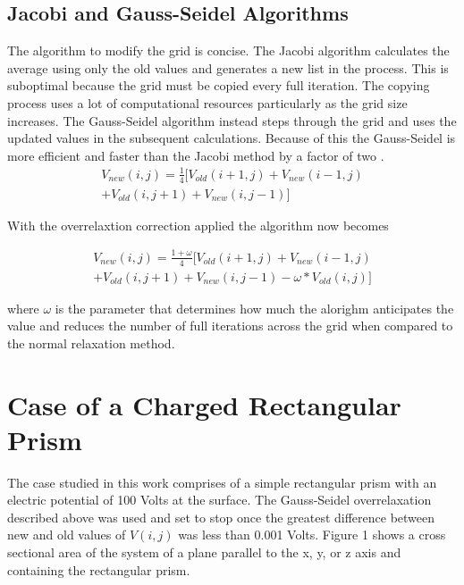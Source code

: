 \documentclass[aps,prb,twocolumn,amsfonts,showpacs,letterpaper]{revtex4}
\begin{document}
\subsection{Jacobi and Gauss-Seidel Algorithms}
The algorithm to modify the grid is concise. The Jacobi algorithm calculates the average using only the old values and generates a new list in the process. This is suboptimal because the grid must be copied every full iteration. The copying process uses a lot of computational resources particularly as the grid size increases. The Gauss-Seidel algorithm instead steps through the grid and uses the updated values in the subsequent calculations. Because of this the Gauss-Seidel is more efficient and faster than the Jacobi method by a factor of two \cite{gio}.
\begin{multline}
V_{new}(i,j) = \frac{1}{4}[V_{old}(i+1,j) + V_{new}(i-1,j)\\ + V_{old}(i,j+1) + V_{new}(i,j-1)]
\end{multline}

With the overrelaxtion correction applied the algorithm now becomes

\begin{multline}
V_{new}(i,j) = \frac{1+\omega}{4}[V_{old}(i+1,j) + V_{new}(i-1,j)\\ + V_{old}(i,j+1) + V_{new}(i,j-1)-\omega*V_{old}(i,j)]
\end{multline}

where $\omega$ is the parameter that determines how much the alorighm anticipates the value and reduces the number of full iterations across the grid when compared to the normal relaxation method.

\section{Case of a Charged Rectangular Prism}
The case studied in this work comprises of a simple rectangular prism with an electric potential of 100 Volts at the surface. The Gauss-Seidel overrelaxation described above was used and set to stop once the greatest difference between new and old values of $V(i,j)$ was less than 0.001 Volts. Figure 1 shows a cross sectional area of the system of a plane parallel to the x, y, or z axis and containing the rectangular prism.
\end{document}

